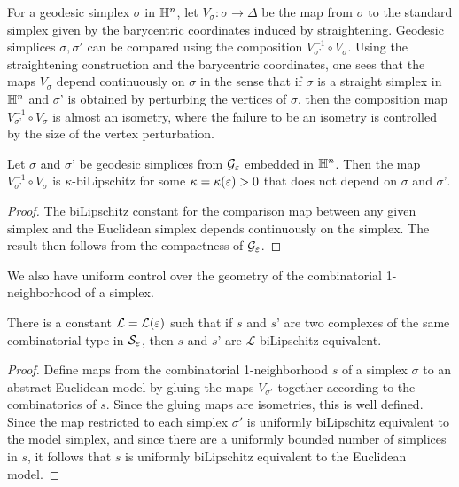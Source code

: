 For a geodesic simplex $\sigma$ in $\mathbb H^n$, let $V_{\sigma}:\sigma \to \Delta$ be the map from $\sigma$ to the standard simplex given by the barycentric coordinates induced by straightening. Geodesic simplices $\sigma,\sigma'$ can be compared using the composition $V_{\sigma’}^{-1}\circ V_{\sigma}$.
Using the straightening construction and the barycentric coordinates, one sees that the maps $V_{\sigma}$ depend continuously on $\sigma$ in the sense that if $\sigma$ is a straight simplex in $\mathbb H^n$ and $\sigma’$ is obtained by perturbing the vertices of $\sigma$, then the composition map $V_{\sigma’}^{-1}\circ V_{\sigma}$ is almost an isometry, where the failure to be an isometry is controlled by the size of the vertex perturbation.


\begin{prop}\label{prop: simplices biLipschitz} Let $\sigma$ and $\sigma’$ be geodesic simplices from $\mathcal G_\varepsilon$ embedded in $\mathbb H^n$. Then the map $V_{\sigma’}^{-1}\circ V_{\sigma}$ is $\kappa$-biLipschitz for some $\kappa = \kappa(\varepsilon)>0$ that does not depend on $\sigma$ and $\sigma’$.
\end{prop}
\begin{proof}
The biLipschitz constant for the comparison map between any given simplex and the Euclidean simplex depends continuously on the simplex. The result then follows from the compactness of $\mathcal G_\varepsilon$.
\end{proof}


We also have uniform control over the geometry of the combinatorial 1-neighborhood of a simplex.

\begin{prop}\label{prop: stars biLipschitz} There is a constant $\mathcal L = \mathcal L(\varepsilon)$ such that  if $s$ and $s’$ are two complexes of the same combinatorial type in $\mathcal S_\varepsilon$, then $s$ and $s’$ are $\mathcal L$-biLipschitz equivalent.
\end{prop}
\begin{proof}
    Define maps from the combinatorial 1-neighborhood $s$ of a simplex $\sigma$ to an abstract Euclidean model by gluing the maps $V_{\sigma'}$ together according to the combinatorics of $s$. Since the gluing maps are isometries, this is well defined. Since the map restricted to each simplex $\sigma'$ is uniformly biLipschitz equivalent to the model simplex, and since there are a uniformly bounded number of simplices in $s$, it follows that $s$ is uniformly biLipschitz equivalent to the Euclidean model.
\end{proof}

